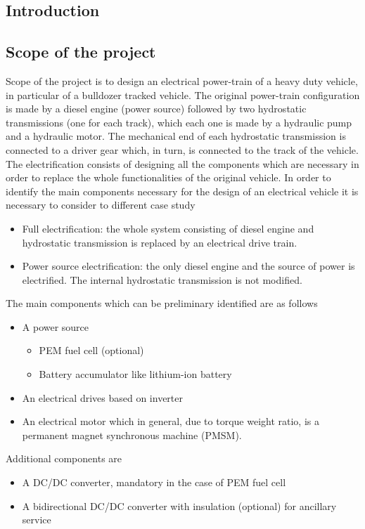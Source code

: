 \documentclass[12pt,a4paper,oneside]{book}
\begin{document}
\begin{onehalfspace}
\chapter{Introduction}
\section{Scope of the project}
Scope of the project is to design an electrical power-train of a heavy duty vehicle, in particular of a bulldozer tracked vehicle. The original power-train configuration is made by a diesel engine (power source) followed by two hydrostatic transmissions (one for each track), which each one is made by a hydraulic pump and a hydraulic motor.  The mechanical end of each hydrostatic transmission is connected to a driver gear which, in turn, is connected to the track of the vehicle. The electrification consists of designing all the components which are necessary in order to replace the whole functionalities of the original vehicle. In order to identify the main components necessary for the design of an electrical vehicle it is necessary to consider to different case study
\begin{itemize}
	\item[--] Full electrification: the whole system consisting of diesel engine and hydrostatic transmission is replaced by an electrical drive train. 
	\item[--] Power source electrification: the only diesel engine and the source of power is electrified. The internal hydrostatic transmission is not modified.
\end{itemize}
The main components which can be preliminary identified are as follows
\begin{itemize}
	\item[--] A power source 
		\begin{itemize}
			\item[--] PEM fuel cell (optional) 
			\item[--] Battery accumulator like lithium-ion battery	
		\end{itemize}
	\item[--] An electrical drives based on inverter 
	\item[--] An electrical motor which in general, due to torque weight ratio, is a permanent magnet synchronous machine (PMSM).
\end{itemize} 
Additional components are 
\begin{itemize}
	\item[--] A DC/DC converter, mandatory in the case of PEM fuel cell
	\item[--] A bidirectional DC/DC converter with insulation (optional) for ancillary service
\end{itemize}


\end{onehalfspace}
\end{document}
